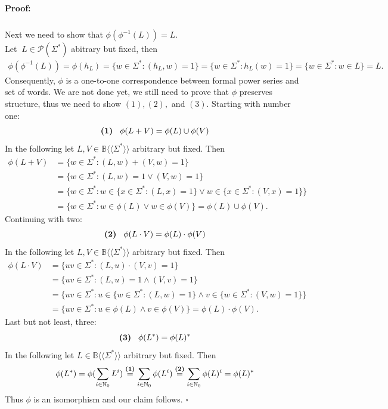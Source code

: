 \documentclass[12pt,letterpaper]{article}
\newenvironment{proof}{\paragraph{Proof:}}{\hfill$\square$}
\newcommand{\fps}[1] {
\mathbb{#1}\langle \langle \Sigma^* \rangle \rangle
}
\begin{document}
\begin{proof}
\begin{align*}
    \end{align*}
    Next we need to show that $\phi(\phi^{-1}(L)) = L.$\\
    Let $\ L \in \mathcal{P}(\Sigma^*)$ abitrary but fixed, then
    \begin{align*}
      \phi(\phi^{-1}(L)) = \phi(h_L) = \{w \in \Sigma^* : (h_L,w) = 1 \}
      = \{ w \in \Sigma^* : h_L(w) = 1\} = \{ w \in \Sigma^* : w \in L\} = L.
    \end{align*}
    Consequently, $\phi$ is a one-to-one correspondence between formal power
    series and set of words.
    We are not done yet, we still need to prove that $\phi$ preserves
    structure, thus we need to show $(1), (2),$ and $(3)$. Starting with
    number one:
    \[ \text{\bf (1)} \hspace{0.3cm} \phi(L+V) = \phi(L) \cup \phi(V) \]
    In the following let $L,V \in \fps{B}$ arbitrary but fixed. Then
    \begin{align*}
      \phi(L+V) &= \{ w \in \Sigma^* : (L,w) + (V,w) = 1 \} \\
        &= \{ w \in \Sigma^* : (L,w) = 1 \lor (V,w) = 1 \} \\
        &= \{ w \in \Sigma^* : w \in \{ x \in \Sigma^* : (L,x) = 1 \}
        \lor w \in \{ x \in \Sigma^* :(V,x) = 1 \} \} \\
        &= \{ w \in \Sigma^* : w \in \phi(L) \lor w \in \phi(V) \} 
        = \phi(L) \cup \phi(V).
    \end{align*}
    Continuing with two:
    \[ 
      \text{\bf (2)} \hspace{0.3cm} 
      \phi(L\cdot V) = \phi(L) \cdot \phi(V) 
    \]
    In the following let $L,V \in \fps{B}$ arbitrary but fixed. Then
    \begin{align*}
      \phi(L\cdot V) &= \{ uv \in \Sigma^* : (L,u) \cdot (V,v) = 1\}\\
        &= \{ uv \in \Sigma^* : (L,u) = 1 \land (V,v) = 1\} \\
        &= \{ uv \in \Sigma^* : u \in \{ w \in \Sigma^* : (L,w) = 1\}
          \land v \in \{ w \in \Sigma^* : (V,w) = 1\}
        \} \\
        &= \{ uv \in \Sigma^* : u \in \phi(L)
          \land v \in \phi(V)
        \} = \phi(L) \cdot \phi(V).
    \end{align*}
    Last but not least, three:
    \[ 
      \text{\bf (3)} \hspace{0.3cm} 
      \phi(L^*) = \phi(L)^*
    \]
    In the following let $L \in \fps{B}$ arbitrary but fixed. Then
    \begin{align*}
      \phi(L^*) = \phi(\sum_{i\in \mathbb{N}_0} L^i) 
      \stackrel{\text{\bf (1)}}{=} \sum_{i\in \mathbb{N}_0} \phi(L^i)
      \stackrel{\text{\bf (2)}}{=} \sum_{i\in \mathbb{N}_0} \phi(L)^i
      = \phi(L)^*
    \end{align*}
    Thus $\phi$ is an isomorphism and our claim follows.
\end{proof}
\end{document}
